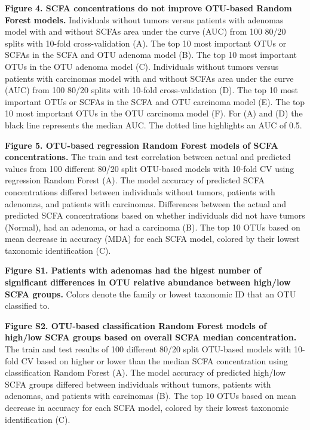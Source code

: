 \documentclass[11pt,]{article}
\begin{document}
\textbf{Figure 4. SCFA concentrations do not improve OTU-based Random
Forest models.} Individuals without tumors versus patients with adenomas
model with and without SCFAs area under the curve (AUC) from 100 80/20
splits with 10-fold cross-validation (A). The top 10 most important OTUs
or SCFAs in the SCFA and OTU adenoma model (B). The top 10 most
important OTUs in the OTU adenoma model (C). Individuals without tumors
versus patients with carcinomas model with and without SCFAs area under
the curve (AUC) from 100 80/20 splits with 10-fold cross-validation (D).
The top 10 most important OTUs or SCFAs in the SCFA and OTU carcinoma
model (E). The top 10 most important OTUs in the OTU carcinoma model
(F). For (A) and (D) the black line represents the median AUC. The
dotted line highlights an AUC of 0.5.

\textbf{Figure 5. OTU-based regression Random Forest models of SCFA
concentrations.} The train and test correlation between actual and
predicted values from 100 different 80/20 split OTU-based models with
10-fold CV using regression Random Forest (A). The model accuracy of
predicted SCFA concentrations differed between individuals without
tumors, patients with adenomas, and patients with carcinomas.
Differences between the actual and predicted SCFA concentrations based
on whether individuals did not have tumors (Normal), had an adenoma, or
had a carcinoma (B). The top 10 OTUs based on mean decrease in accuracy
(MDA) for each SCFA model, colored by their lowest taxonomic
identification (C).

\newpage

\textbf{Figure S1. Patients with adenomas had the higest number of
significant differences in OTU relative abundance between high/low SCFA
groups.} Colors denote the family or lowest taxonomic ID that an OTU
classified to.

\textbf{Figure S2. OTU-based classification Random Forest models of
high/low SCFA groups based on overall SCFA median concentration.} The
train and test results of 100 different 80/20 split OTU-based models
with 10-fold CV based on higher or lower than the median SCFA
concentration using classification Random Forest (A). The model accuracy
of predicted high/low SCFA groups differed between individuals without
tumors, patients with adenomas, and patients with carcinomas (B). The
top 10 OTUs based on mean decrease in accuracy for each SCFA model,
colored by their lowest taxonomic identification (C).
\end{document}
